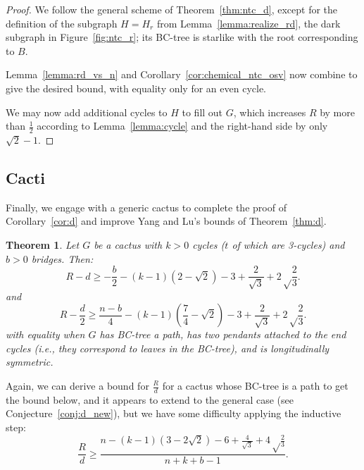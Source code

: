 \documentclass{amsart}
\newtheorem{thm}{Theorem}[section]%
\theoremstyle{definition}
\begin{document}
\begin{proof}
We follow the general scheme of Theorem~\ref{thm:ntc_d}, except for the definition of the subgraph $H=H_r$ from Lemma~\ref{lemma:realize_rd}, the dark subgraph in Figure~\ref{fig:ntc_r}; its BC-tree is starlike with the root corresponding to $B$. 

Lemma~\ref{lemma:rd_vs_n} and Corollary~\ref{cor:chemical_ntc_osv} now combine to give the desired bound, with equality only for an even cycle.

We may now add additional cycles to $H$ to fill out $G$, which increases $R$ by more than $\frac{1}{2} $ according to Lemma~\ref{lemma:cycle} and the right-hand side by only $\sqrt 2 -1$.
\end{proof}

\subsection{Cacti}
Finally, we engage with a generic cactus to complete the proof of Corollary~\ref{cor:d} and improve Yang and Lu's bounds of Theorem~\ref{thm:d}. 

\begin{thm}\label{thm:cactus_d} 
Let $G$ be a cactus with $k>0$ cycles ($t$ of which are 3-cycles) and $b>0$ bridges. Then:
\[R - d \geq -\frac{b}{2} - (k-1)\left(2 - \sqrt 2 \right) - 3 + \frac{2}{\sqrt 3} + 2\sqrt\frac{2}{3}.\]
and
\[R - \frac{d}{2} \geq \frac{n-b}{4} - (k-1)\left(\frac{7}{4} - \sqrt 2 \right) - 3 + \frac{2}{\sqrt 3} + 2\sqrt\frac{2}{3}.\]
with equality when $G$ has BC-tree a path, has two pendants attached to the end cycles (i.e., they correspond to leaves in the BC-tree), and is longitudinally symmetric.
\end{thm}

Again, we can derive a bound for $\frac{R}{d}$ for a cactus whose BC-tree is a path to get the bound below, and it appears to extend to the general case (see Conjecture~\ref{conj:d_new}), but we have some difficulty applying the inductive step:
\[\frac{R}{d} \geq \frac{ n - (k-1)\left(3 - 2\sqrt 2 \right) - 6 + \frac{4}{\sqrt 3} + 4\sqrt\frac{2}{3}}{n+k+b-1}.\]
\end{document}
